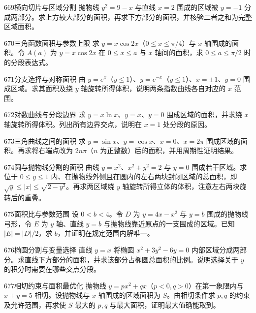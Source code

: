 \begin{exercise}{669}{横向切片与区域分割}
抛物线 $y^2=9-x$ 与直线 $x=2$ 围成的区域被 $y=-1$ 分成两部分。求上方较大部分的面积，再求下方部分的面积，并核验二者之和为完整区域面积。
\end{exercise}
\begin{exercise}{670}{三角函数面积与参数上限}
求 $y=x\cos2x$（$0\le x\le\pi/4$）与 $x$ 轴围成的面积。令 $A(a)$ 为 $y=x\cos2x$ 在 $0\le x\le a$ 与 $x$ 轴间的面积，求 $0\le a\le\pi/2$ 时的分段表达式。
\end{exercise}
\begin{exercise}{671}{分支选择与对称面积}
由 $y=e^x$（$y\le1$）、$y=e^{-x}$（$y\le1$）、$x=\pm1$、$y=0$ 围成区域。求其面积及绕 $y$ 轴旋转所得体积，说明两条指数曲线各自对应的 $x$ 范围。
\end{exercise}
\begin{exercise}{672}{对数曲线与分段边界}
求 $y=x\ln x$、$y=x$、$y=0$ 围成区域的面积，并求绕 $x$ 轴旋转所得体积。列出所有边界交点，说明在 $x=1$ 处分段的原因。
\end{exercise}
\begin{exercise}{673}{三角曲线之间的面积}
求 $y=\sin x$、$y=\cos x$、$x=0$、$x=2\pi$ 围成区域的面积。再求将右端点改为 $2n\pi$（$n$ 为正整数）后的面积，并用周期性证明结果。
\end{exercise}
\begin{exercise}{674}{圆与抛物线分割的面积}
曲线 $y=x^2$、$x^2+y^2=2$ 与 $y=0$ 围成若干区域。求位于 $0\le y\le1$ 内、在抛物线外侧且在圆内的左右两块封闭区域的总面积，即 $\sqrt y\le|x|\le\sqrt{2-y^2}$。再求两区域绕 $y$ 轴旋转所得立体的体积，注意左右两块旋转后的重叠。
\end{exercise}
\begin{exercise}{675}{面积比与参数范围}
设 $0<b<4$。令 $D$ 为 $y=4x-x^2$ 与 $y=b$ 围成的抛物线弓形，令 $E$ 为 $y$ 轴、直线 $y=b$ 与抛物线靠近原点的一支围成的区域。已知 $|E|=|D|/2$，求 $b$，并证明在规定范围内解唯一。
\end{exercise}
\begin{exercise}{676}{椭圆分割与变量选择}
直线 $y=x$ 将椭圆 $x^2+3y^2-6y=0$ 内部区域分成两部分。求直线下方部分的面积，并求该部分占椭圆总面积的比例。说明选择关于 $y$ 的积分时需要在哪些交点分段。
\end{exercise}
\begin{exercise}{677}{相切约束与面积最优化}
抛物线 $y=px^2+qx$（$p<0,q>0$）在第一象限内与 $x+y=5$ 相切。设抛物线与 $x$ 轴围成的区域面积为 $S$。由相切条件求 $p,q$ 的约束及允许范围，再求使 $S$ 最大的 $p,q$ 与最大面积，证明最大值确能取到。
\end{exercise}
